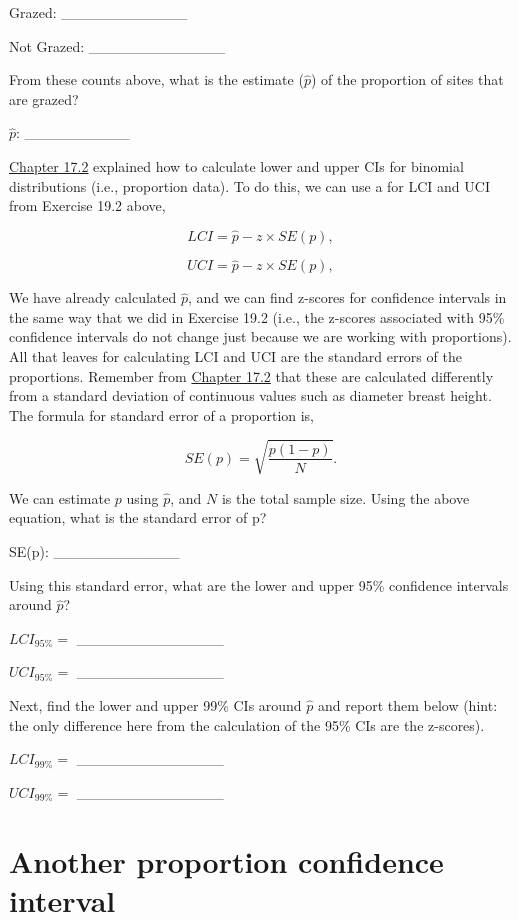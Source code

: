 \documentclass[
]{scrbook}
\begin{document}
Grazed: \_\_\_\_\_\_\_\_\_\_\_\_

Not Grazed: \_\_\_\_\_\_\_\_\_\_\_\_\_

From these counts above, what is the estimate (\(\hat{p}\)) of the proportion of sites that are grazed?

\(\hat{p}\): \_\_\_\_\_\_\_\_\_\_

\href{Chapter_17.html\#binomial-distribution-cis}{Chapter 17.2} explained how to calculate lower and upper CIs for binomial distributions (i.e., proportion data).
To do this, we can use a for LCI and UCI from Exercise 19.2 above,

\[LCI = \hat{p} - z \times SE(p),\]

\[UCI = \hat{p} - z \times SE(p),\]

We have already calculated \(\hat{p}\), and we can find z-scores for confidence intervals in the same way that we did in Exercise 19.2 (i.e., the z-scores associated with 95\% confidence intervals do not change just because we are working with proportions).
All that leaves for calculating LCI and UCI are the standard errors of the proportions.
Remember from \href{Chapter_17.html\#binomial-distribution-cis}{Chapter 17.2} that these are calculated differently from a standard deviation of continuous values such as diameter breast height.
The formula for standard error of a proportion is,

\[SE(p) = \sqrt{\frac{p\left(1 - p\right)}{N}}.\]

We can estimate \(p\) using \(\hat{p}\), and \(N\) is the total sample size.
Using the above equation, what is the standard error of p?

SE(p): \_\_\_\_\_\_\_\_\_\_\_\_

Using this standard error, what are the lower and upper 95\% confidence intervals around \(\hat{p}\)?

\(LCI_{95\%} =\) \_\_\_\_\_\_\_\_\_\_\_\_\_\_

\(UCI_{95\%} =\) \_\_\_\_\_\_\_\_\_\_\_\_\_\_

Next, find the lower and upper 99\% CIs around \(\hat{p}\) and report them below (hint: the only difference here from the calculation of the 95\% CIs are the z-scores).

\(LCI_{99\%} =\) \_\_\_\_\_\_\_\_\_\_\_\_\_\_

\(UCI_{99\%} =\) \_\_\_\_\_\_\_\_\_\_\_\_\_\_

\hypertarget{another-proportion-confidence-interval}{%
\section{Another proportion confidence interval}\label{another-proportion-confidence-interval}}
\end{document}
